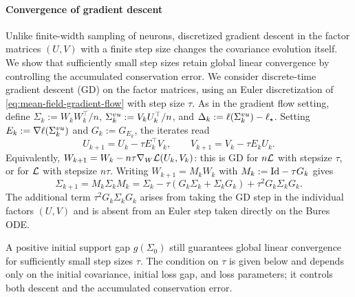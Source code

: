 \paragraph{Convergence of gradient descent}
Unlike finite-width sampling of neurons, discretized gradient descent in the factor matrices $(U, V)$ with a finite step size changes the covariance evolution itself.
We show that sufficiently small step sizes retain global linear convergence by controlling the accumulated conservation error.
We consider discrete-time gradient descent (GD) on the factor matrices, using an Euler discretization of \eqref{eq:mean-field-gradient-flow} with step size $\tau$.
As in the gradient flow setting, define $\Sigma_k:=W_kW_k^\top/n$, $\Sigma^{vu}_k:=V_kU_k^\top/n$, and $\Delta_k:=\ell(\Sigma^{vu}_k)-\ell_\star$.
Setting $E_k:=\nabla\ell(\Sigma^{vu}_k)$ and $G_k:=G_{E_k}$, the iterates read
\begin{equation}\label{eq:gd-algorithm}
 U_{k+1}=U_k-\tau E_k^\top V_k,\qquad
 V_{k+1}=V_k-\tau E_kU_k.
\end{equation}
Equivalently, $W_{k+1}=W_k-n\tau\nabla_W\mathcal L(U_k,V_k)$: this is GD for $n\mathcal L$ with stepsize $\tau$, or for $\mathcal L$ with stepsize $n\tau$.
Writing $W_{k+1}=M_kW_k$ with $M_k:=\mathrm{Id}-\tau G_k$ gives
\begin{equation}\label{eq:gd-covariance}
 \Sigma_{k+1}=M_k\Sigma_kM_k
 =\Sigma_k-\tau(G_k\Sigma_k+\Sigma_kG_k)+\tau^2G_k\Sigma_kG_k.
\end{equation}
The additional term $\tau^2G_k\Sigma_kG_k$ arises from taking the GD step in the individual factors $(U,V)$ and is absent from an Euler step taken directly on the Bures ODE.

A positive initial support gap $g(\Sigma_0)$ still guarantees global linear convergence for sufficiently small step sizes $\tau$. 
The condition on $\tau$ is given below and depends only on the initial covariance, initial loss gap, and loss parameters; it controls both 
descent and the accumulated conservation error.

